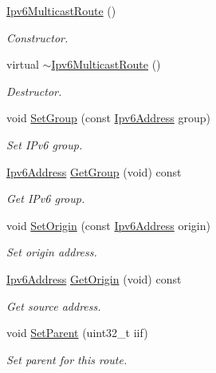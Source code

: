 \begin{DoxyCompactItemize}
\item 
\hyperlink{classns3_1_1Ipv6MulticastRoute_a5578652051075133a6093ce5a4ab246d}{Ipv6\+Multicast\+Route} ()
\begin{DoxyCompactList}\small\item\em Constructor. \end{DoxyCompactList}\item 
virtual \hyperlink{classns3_1_1Ipv6MulticastRoute_af2e0580520a036a59e7693ae10aa534c}{$\sim$\+Ipv6\+Multicast\+Route} ()
\begin{DoxyCompactList}\small\item\em Destructor. \end{DoxyCompactList}\item 
void \hyperlink{classns3_1_1Ipv6MulticastRoute_ae8572d8099d41fbb2899b98cd078ffab}{Set\+Group} (const \hyperlink{classns3_1_1Ipv6Address}{Ipv6\+Address} group)
\begin{DoxyCompactList}\small\item\em Set I\+Pv6 group. \end{DoxyCompactList}\item 
\hyperlink{classns3_1_1Ipv6Address}{Ipv6\+Address} \hyperlink{classns3_1_1Ipv6MulticastRoute_a702607378bb9b626cbfcebd28fa3f520}{Get\+Group} (void) const 
\begin{DoxyCompactList}\small\item\em Get I\+Pv6 group. \end{DoxyCompactList}\item 
void \hyperlink{classns3_1_1Ipv6MulticastRoute_a069ef587fa2d3486f1402c752e993fc7}{Set\+Origin} (const \hyperlink{classns3_1_1Ipv6Address}{Ipv6\+Address} origin)
\begin{DoxyCompactList}\small\item\em Set origin address. \end{DoxyCompactList}\item 
\hyperlink{classns3_1_1Ipv6Address}{Ipv6\+Address} \hyperlink{classns3_1_1Ipv6MulticastRoute_af55c078cf68fc847f2b550fcd0e706bd}{Get\+Origin} (void) const 
\begin{DoxyCompactList}\small\item\em Get source address. \end{DoxyCompactList}\item 
void \hyperlink{classns3_1_1Ipv6MulticastRoute_a8a9fac1479d2fa5a62fc86c41b247030}{Set\+Parent} (uint32\+\_\+t iif)
\begin{DoxyCompactList}\small\item\em Set parent for this route. \end{DoxyCompactList}\item 

\end{DoxyCompactItemize}
